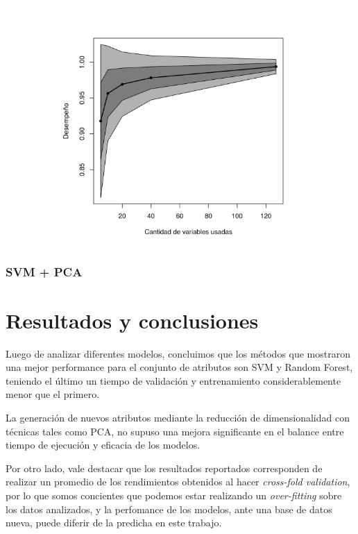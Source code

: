 \documentclass[a4paper,10pt]{article}
\begin{document}
\begin{figure}[H]
  \centering
  \begin{subfigure}[b]{0.4\textwidth}
    \includegraphics[width=\textwidth]{../imagenes/rf}
     
  \end{subfigure}
  \caption{}
  \label{fig:rf}
\end{figure}

\subsubsection{SVM + PCA}


\section{Resultados y conclusiones}

\par Luego de analizar diferentes modelos, concluimos que los métodos que mostraron una mejor performance para el conjunto de atributos son SVM y Random Forest, teniendo el último un tiempo de validación y entrenamiento considerablemente menor que el primero.
\par La generación de nuevos atributos mediante la reducción de dimensionalidad con técnicas tales como PCA, no supuso una mejora significante en el balance entre tiempo de ejecución y eficacia de los modelos. 
\par Por otro lado, vale destacar que los resultados reportados corresponden de realizar un promedio de los rendimientos obtenidos al hacer \emph{cross-fold validation}, por lo que somos concientes que podemos estar realizando un \emph{over-fitting} sobre los datos analizados, y la perfomance de los modelos, ante una base de datos nueva, puede diferir de la predicha en este trabajo.
\end{document}
